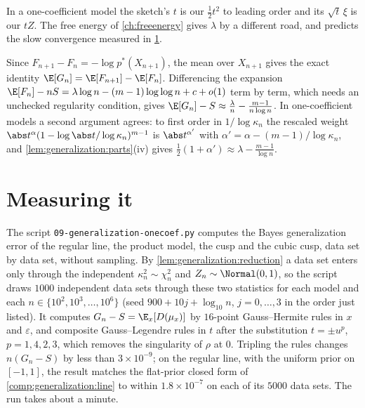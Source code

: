 \begin{refsection}
In a one-coefficient model the sketch's $t$ is our $\frac12t^2$ to leading order and its $\sqrt t\,\xi$ is our $tZ$. The free energy of \cref{ch:freeenergy} gives $\lambda$ by a different road, and predicts the slow convergence measured in \cref{sec:generalization:measuring}.

\begin{heuristic}
Since $F_{n+1}-F_n=-\log p^*(X_{n+1})$, the mean over $X_{n+1}$ gives the exact identity $\E[G_n]=\E[F_{n+1}]-\E[F_n]$. Differencing the expansion $\E[F_n]-nS=\lambda\log n-(m-1)\log\log n+c+o(1)$ \parencite{Watanabe2024} term by term, which needs an unchecked regularity condition, gives $\E[G_n]-S\approx\frac\lambda n-\frac{m-1}{n\log n}$. In one-coefficient models a second argument agrees: to first order in $1/\log\kappa_n$ the rescaled weight $\abs t^\alpha(1-\log\abs t/\log\kappa_n)^{m-1}$ is $\abs t^{\alpha'}$ with $\alpha'=\alpha-(m-1)/\log\kappa_n$, and \cref{lem:generalization:parts}(iv) gives $\frac12(1+\alpha')\approx\lambda-\frac{m-1}{\log n}$.
\end{heuristic}

\section{Measuring it}\label{sec:generalization:measuring}

The script \texttt{09-generalization-onecoef.py} computes the Bayes generalization error of the regular line, the product model, the cusp and the cubic cusp, data set by data set, without sampling. By \cref{lem:generalization:reduction} a data set enters only through the independent $\kappa_n^2\sim\chi^2_n$ and $Z_n\sim\Normal(0,1)$, so the script draws $1000$ independent data sets through these two statistics for each model and each $n\in\{10^2,10^3,\dots,10^6\}$ (seed $900+10j+\log_{10}n$, $j=0,\dots,3$ in the order just listed). It computes $G_n-S=\E_x[D(\mu_x)]$ by $16$-point Gauss--Hermite rules in $x$ and $\varepsilon$, and composite Gauss--Legendre rules in $t$ after the substitution $t=\pm u^p$, $p=1,4,2,3$, which removes the singularity of $\rho$ at $0$. Tripling the rules changes $n(G_n-S)$ by less than $3\times10^{-9}$; on the regular line, with the uniform prior on $[-1,1]$, the result matches the flat-prior closed form of \cref{comp:generalization:line} to within $1.8\times10^{-7}$ on each of its $5000$ data sets. The run takes about a minute.


\end{refsection}
